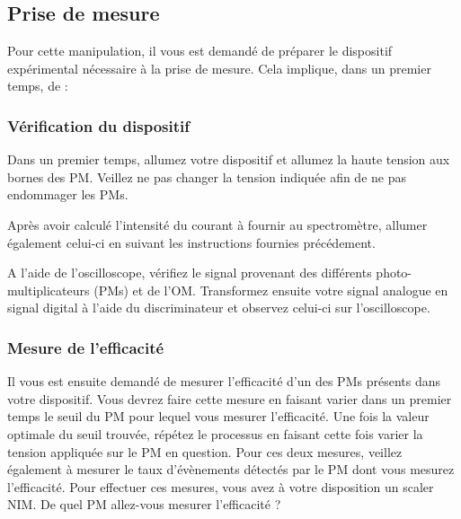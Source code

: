 \subsection{Prise de mesure}
Pour cette manipulation, il vous est demandé de préparer le dispositif expérimental nécessaire à la prise de mesure. Cela implique, dans un premier temps, de :
\begin{center}
\end{center}

\subsubsection{Vérification du dispositif}
Dans un premier temps, allumez votre dispositif et allumez la haute tension aux bornes des PM. Veillez ne pas changer la tension indiquée afin de ne pas endommager les PMs.

Après avoir calculé l'intensité du courant à fournir au spectromètre, allumer également celui-ci en suivant les instructions fournies précédement.

A l'aide de l'oscilloscope, vérifiez le signal provenant des différents photo-multiplicateurs (PMs) et de l'OM. Transformez ensuite votre signal analogue en signal digital à l'aide du discriminateur et observez celui-ci sur l'oscilloscope.

\subsubsection{Mesure de l'efficacité}
Il vous est ensuite demandé de mesurer l'efficacité d'un des PMs présents dans votre dispositif. Vous devrez faire cette mesure en faisant varier dans un premier temps le seuil du PM pour lequel vous mesurer l'efficacité. Une fois la valeur optimale du seuil trouvée, répétez le processus en faisant cette fois varier la tension appliquée sur le PM en question. Pour ces deux mesures, veillez également à mesurer le taux d'évènements détectés par le PM dont vous mesurez l'efficacité. Pour effectuer ces mesures, vous avez à votre disposition un scaler NIM. De quel PM allez-vous mesurer l'efficacité ?

